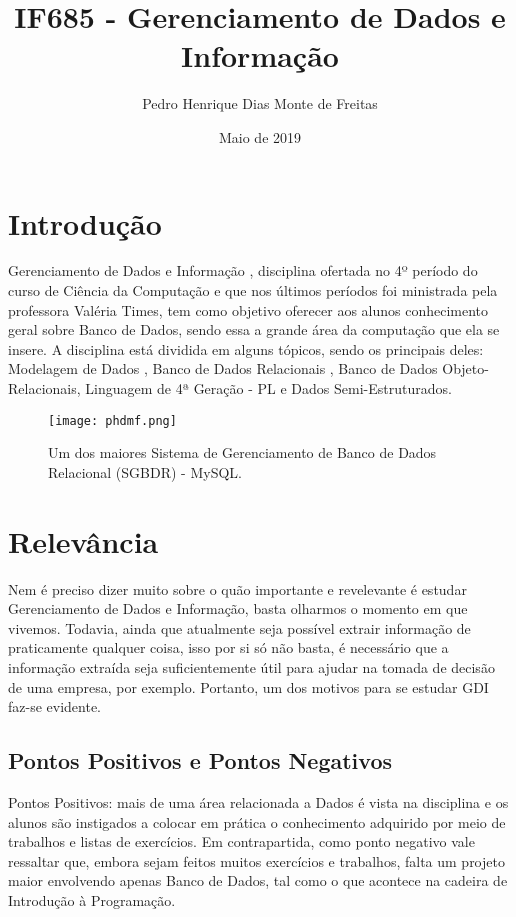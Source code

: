 \documentclass[10pt]{article}
\title{IF685 - Gerenciamento de Dados e Informação}
\author{Pedro Henrique Dias Monte de Freitas}
\date{Maio de 2019}
\begin{document}
\maketitle

\section{Introdução}
Gerenciamento de Dados e Informação \cite{site}, disciplina ofertada no 4º período do curso de Ciência da Computação e que nos últimos períodos foi ministrada pela professora Valéria Times, tem como objetivo oferecer aos alunos conhecimento geral sobre Banco de Dados, sendo essa a grande área da computação que ela se insere. A disciplina está dividida em alguns tópicos, sendo os principais deles: Modelagem de Dados \cite{navathe}, Banco de Dados Relacionais \cite{ramak}, Banco de Dados Objeto-Relacionais, Linguagem de 4ª Geração - PL e Dados Semi-Estruturados.

\begin{figure}[h!]
\centering
\texttt{[image: phdmf.png]}
\caption{Um dos maiores Sistema de Gerenciamento de Banco de Dados Relacional (SGBDR) - MySQL. \cite{img}}
\label{fig:phdmf}
\end{figure}

\section{Relevância}
Nem é preciso dizer muito sobre o quão importante e revelevante é estudar Gerenciamento de Dados e Informação, basta olharmos o momento em que vivemos. Todavia, ainda que atualmente seja possível extrair informação de praticamente qualquer coisa, isso por si só não basta, é necessário que a informação extraída seja suficientemente útil para ajudar na tomada de decisão de uma empresa, por exemplo. Portanto, um dos motivos para se estudar GDI faz-se evidente.

\subsection{Pontos Positivos e Pontos Negativos}
Pontos Positivos: mais de uma área relacionada a Dados é vista na disciplina e os alunos são instigados a colocar em prática o conhecimento adquirido por meio de trabalhos e listas de exercícios. Em contrapartida, como ponto negativo vale ressaltar que, embora sejam feitos muitos exercícios e trabalhos, falta um projeto maior envolvendo apenas Banco de Dados, tal como o que acontece na cadeira de Introdução à Programação.  
\end{document}
